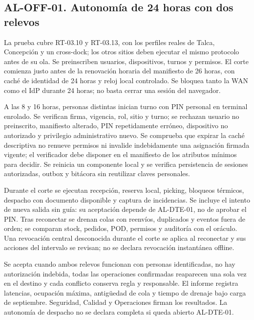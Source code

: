 \subsection*{AL-OFF-01. Autonomía de 24 horas con dos relevos}
La prueba cubre RT-03.10 y RT-03.13, con los perfiles reales de Talca, Concepción y un cross-dock; los otros sitios deben ejecutar el mismo protocolo antes de su ola. Se preinscriben usuarios, dispositivos, turnos y permisos. El corte comienza justo antes de la renovación horaria del manifiesto de 26 horas, con caché de identidad de 24 horas y reloj local controlado. Se bloquea tanto la WAN como el IdP durante 24 horas; no basta cerrar una sesión del navegador.

A las 8 y 16 horas, personas distintas inician turno con PIN personal en terminal enrolado. Se verifican firma, vigencia, rol, sitio y turno; se rechazan usuario no preinscrito, manifiesto alterado, PIN repetidamente erróneo, dispositivo no autorizado y privilegio administrativo nuevo. Se comprueba que expirar la caché descriptiva no renueve permisos ni invalide indebidamente una asignación firmada vigente; el verificador debe disponer en el manifiesto de los atributos mínimos para decidir. Se reinicia un componente local y se verifica persistencia de sesiones autorizadas, outbox y bitácora sin reutilizar claves personales.

Durante el corte se ejecutan recepción, reserva local, picking, bloqueos térmicos, despacho con documento disponible y captura de incidencias. Se incluye el intento de nueva salida sin guía: su aceptación depende de AL-DTE-01, no de aprobar el PIN. Tras reconectar se drenan colas con reenvíos, duplicados y eventos fuera de orden; se comparan stock, pedidos, POD, permisos y auditoría con el oráculo. Una revocación central desconocida durante el corte se aplica al reconectar y sus acciones del intervalo se revisan; no se declara revocación instantánea offline.

Se acepta cuando ambos relevos funcionan con personas identificadas, no hay autorización indebida, todas las operaciones confirmadas reaparecen una sola vez en el destino y cada conflicto conserva regla y responsable. El informe registra latencias, ocupación máxima, antigüedad de cola y tiempo de drenaje bajo carga de septiembre. Seguridad, Calidad y Operaciones firman los resultados. La autonomía de despacho no se declara completa si queda abierto AL-DTE-01.
